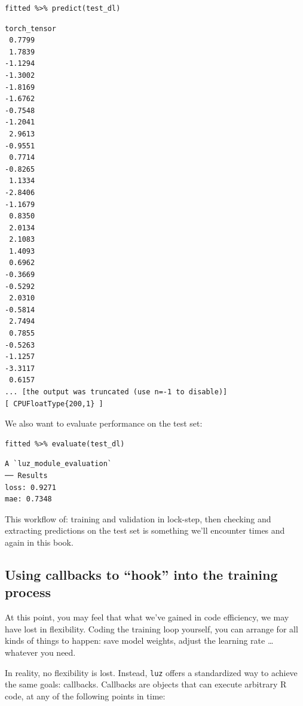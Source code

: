 \documentclass[
  letterpaper,
]{krantz}
\begin{document}
\begin{verbatim}
fitted %>% predict(test_dl)
\end{verbatim}

\begin{verbatim}
torch_tensor
 0.7799
 1.7839
-1.1294
-1.3002
-1.8169
-1.6762
-0.7548
-1.2041
 2.9613
-0.9551
 0.7714
-0.8265
 1.1334
-2.8406
-1.1679
 0.8350
 2.0134
 2.1083
 1.4093
 0.6962
-0.3669
-0.5292
 2.0310
-0.5814
 2.7494
 0.7855
-0.5263
-1.1257
-3.3117
 0.6157
... [the output was truncated (use n=-1 to disable)]
[ CPUFloatType{200,1} ]
\end{verbatim}

We also want to evaluate performance on the test
set:

\begin{verbatim}
fitted %>% evaluate(test_dl)
\end{verbatim}

\begin{verbatim}
A `luz_module_evaluation`
── Results 
loss: 0.9271
mae: 0.7348
\end{verbatim}

This workflow of: training and validation in lock-step, then checking
and extracting predictions on the test set is something we'll encounter
times and again in this book.

\hypertarget{using-callbacks-to-hook-into-the-training-process}{%
\subsection{\texorpdfstring{Using callbacks to ``hook'' into the
training
process}{Using callbacks to ``hook'' into the training process}}\label{using-callbacks-to-hook-into-the-training-process}}

At this point, you may feel that what we've gained in code efficiency,
we may have lost in flexibility. Coding the training loop yourself, you
can arrange for all kinds of things to happen: save model weights,
adjust the learning rate \ldots{} whatever you need.

In reality, no flexibility is lost. Instead, \texttt{luz} offers a
standardized way to achieve the same goals: callbacks. Callbacks are
objects that can execute arbitrary R code, at any of the following
points in time:
\end{document}
